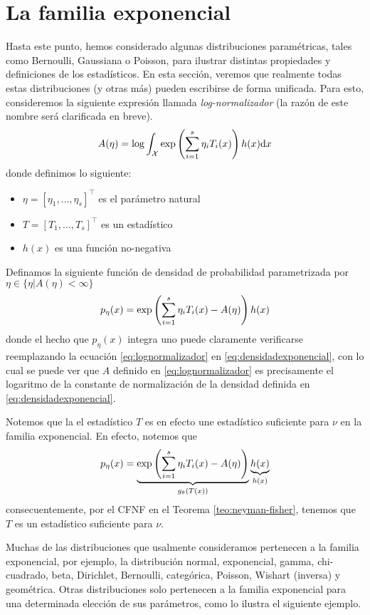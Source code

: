 \section{La familia exponencial}

Hasta este punto, hemos considerado algunas distribuciones paramétricas, tales como Bernoulli, Gaussiana o Poisson, para ilustrar distintas propiedades y definiciones de los estadísticos. En esta sección, veremos que realmente todas estas distribuciones (y otras más) pueden escribirse de forma unificada. Para esto, consideremos la siguiente expresión llamada \textit{log-normalizador} (la razón de este nombre será clarificada en breve).
\begin{equation}
	\label{eq:lognormalizador}
	A(\eta) = \log\int_{\mathcal X} \exp\left(\sum_{i=1}^s\eta_iT_i(x)\right)h(x){\text{d}x}
\end{equation}
donde definimos lo siguiente:
\begin{itemize}
	\item $\eta = [\eta_1,\ldots,\eta_s]^\top$ es el parámetro natural
	\item $T = [T_1,\ldots,T_s]^\top$ es un estadístico
	\item $h(x)$ es una función no-negativa
\end{itemize}
Definamos la siguiente función de densidad de probabilidad parametrizada por $\eta\in\{\eta | A(\eta)<\infty\}$
\begin{equation}
	\label{eq:densidadexponencial}
 	p_\eta(x) = \exp\left(\sum_{i=1}^s\eta_iT_i(x)-A(\eta)\right)h(x)
 \end{equation} 
 donde el hecho que $p_\eta(x)$ integra uno puede claramente verificarse reemplazando la ecuación \eqref{eq:lognormalizador} en \eqref{eq:densidadexponencial}, con lo cual se puede ver que $A$ definido en \eqref{eq:lognormalizador} es precisamente el logaritmo de la constante de normalización de la densidad definida en \eqref{eq:densidadexponencial}.

 Notemos que la el estadístico $T$ es en efecto une estadístico suficiente para $\nu$ en la familia exponencial. En efecto, notemos que 
 \begin{equation}
	\label{eq:densidadexponencial2}
 	p_\eta(x) = \underbrace{\exp\left(\sum_{i=1}^s\eta_iT_i(x)-A(\eta)\right)}_{g_\theta(T(x))}\underbrace{h(x)}_{h(x)}
 \end{equation} 
consecuentemente, por el CFNF en el Teorema \ref{teo:neyman-fisher}, tenemos que $T$ es 
un estadístico suficiente para $\nu$.

Muchas de las distribuciones que usalmente consideramos pertenecen a la familia exponencial, por ejemplo, la distribución normal, exponencial, gamma, chi-cuadrado, beta, Dirichlet, Bernoulli, categórica, Poisson, Wishart (inversa) y geométrica. Otras distribuciones solo pertenecen a la familia exponencial para una determinada elección de sus parámetros, como lo ilustra el siguiente ejemplo.

